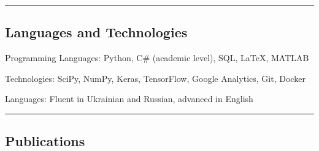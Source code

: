 \documentclass[10pt,letterpaper]{article}
\makeatletter
\newenvironment{indentsection}[1]%
{\begin{list}{}%
	{\setlength{\leftmargin}{#1}}%
	\item[]%
}
{\end{list}}
\newcommand{\headerrow}[2]
{\begin{tabular*}{\linewidth}{l@{\extracolsep{\fill}}r}
	#1 &
	#2 \\
\end{tabular*}}
\makeatother
\begin{document}
%
%	
%

\hrule
\vspace{-0.4em}
\subsection*{Languages and Technologies}

\begin{indentsection}{\parindent}
\begin{description*}
	\item[Programming Languages:]
	Python, C\# (academic level), SQL, \LaTeX, MATLAB
	\item[Technologies:]
	SciPy, NumPy, Keras, TensorFlow, Google Analytics, Git, Docker
	\item[Languages:]
	Fluent in Ukrainian and Russian, advanced in English
\end{description*}
\end{indentsection}

\hrule
\vspace{-0.4em}
\subsection*{Publications}
\end{document}

